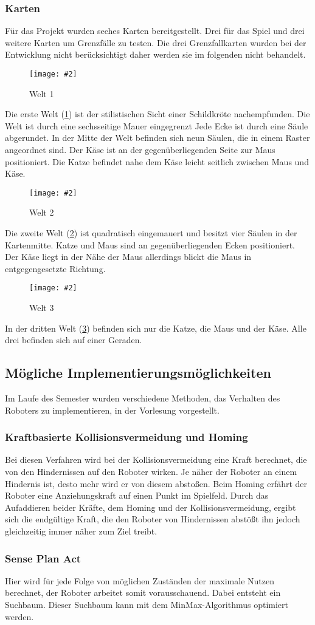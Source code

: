 \documentclass[
a4paper,     %
12pt         %
]{scrartcl}  %
\newcommand{\mygraphics}[3]{
\begin{figure}[!h]
  \begin{center}
    \texttt{[image: \#2]} \\
    \caption{#3}\label{fig:#2}
  \end{center}
\end{figure}

}
\begin{document}
\subsubsection{Karten}
Für das Projekt wurden seches Karten bereitgestellt. Drei für das Spiel und drei weitere Karten um Grenzfälle zu testen.  Die drei Grenzfallkarten wurden bei der Entwicklung nicht berücksichtigt daher werden sie im folgenden nicht behandelt.
\mygraphics{0.5\textwidth}{Welt1.png}{Welt 1}
\noindent Die erste Welt (\ref{fig:Welt1.png}) ist der stilistischen Sicht einer Schildkröte nachempfunden. Die Welt ist durch eine sechsseitige Mauer eingegrenzt Jede Ecke ist durch eine Säule abgerundet. In der Mitte der Welt befinden sich neun Säulen, die in einem Raster angeordnet sind. Der Käse ist an der gegenüberliegenden Seite zur Maus positioniert. Die Katze befindet nahe dem Käse leicht seitlich zwischen Maus und Käse.\\ \clearpage
\mygraphics{0.5\textwidth}{Welt2.png}{Welt 2}
\noindent Die zweite Welt (\ref{fig:Welt2.png}) ist quadratisch eingemauert und besitzt vier Säulen in der Kartenmitte. Katze und Maus sind an gegenüberliegenden Ecken positioniert. Der Käse liegt in der Nähe der Maus allerdings blickt die Maus in entgegengesetzte Richtung.\\
\mygraphics{0.5\textwidth}{Welt3.png}{Welt 3}
\noindent In der dritten Welt (\ref{fig:Welt3.png}) befinden sich nur die Katze, die Maus und der Käse.
Alle drei befinden sich auf einer Geraden.\clearpage
\subsection{Mögliche Implementierungsmöglichkeiten}
Im Laufe des Semester wurden verschiedene Methoden, das Verhalten des Roboters zu implementieren, in der Vorlesung vorgestellt.
\subsubsection{Kraftbasierte Kollisionsvermeidung und Homing}
Bei diesen Verfahren wird bei der Kollisionsvermeidung eine Kraft berechnet, die von den Hindernissen auf den Roboter wirken. Je näher der Roboter an einem Hindernis ist, desto mehr wird er von diesem  abstoßen. Beim Homing erfährt der Roboter eine Anziehungskraft auf einen Punkt im Spielfeld. Durch das Aufaddieren beider Kräfte, dem Homing und der Kollisionsvermeidung, ergibt sich die endgültige Kraft, die den Roboter von Hindernissen abstößt ihn jedoch gleichzeitig immer näher zum Ziel treibt.
\subsubsection{Sense Plan Act}
Hier wird für jede Folge von möglichen Zuständen der maximale Nutzen berechnet, der Roboter arbeitet somit vorausschauend. Dabei entsteht ein Suchbaum. Dieser Suchbaum kann mit dem MinMax-Algorithmus optimiert werden.
\end{document}
